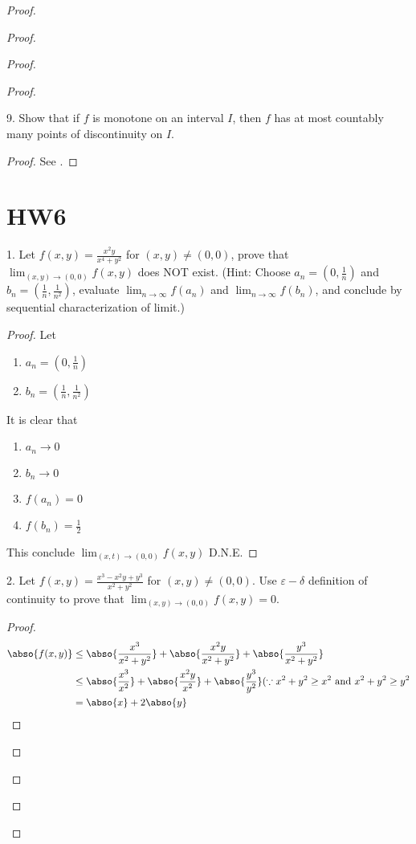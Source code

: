\documentclass{report}
\begin{document}
\begin{proof}
\begin{proof}
\begin{proof}
\begin{proof}
\begin{question}{}{}
9. Show that if \( f \) is monotone on an interval \( I \), then \( f \) has at most countably many points of discontinuity on \( I \).
\end{question}
\begin{proof}
See .
\end{proof}
\section{HW6}
\begin{question}{}{}
1. Let \( f(x, y) = \frac{x^2y}{x^4 + y^2} \) for \( (x, y) \neq (0, 0) \), prove that \( \lim_{(x, y) \to (0,0)} f(x, y) \) does NOT exist.
(Hint: Choose \( a_n = (0, \frac{1}{n}) \) and \( b_n = (\frac{1}{n}, \frac{1}{n^2}) \), evaluate \( \lim_{n \to \infty} f(a_n) \) and \( \lim_{n \to \infty} f(b_n) \), and conclude by sequential characterization of limit.)
\end{question}
\begin{proof}
Let 
\begin{enumerate}[label=(\alph*)]
  \item $a_n=(0,\frac{1}{n})$ 
  \item $b_n=(\frac{1}{n},\frac{1}{n^2})$
\end{enumerate}
It is clear that 
\begin{enumerate}[label=(\alph*)]
  \item $a_n\to 0$ 
  \item  $b_n\to 0$
  \item $f(a_n)=0$ 
  \item $f(b_n)=\frac{1}{2}$
\end{enumerate}
This conclude $\lim_{(x,t)\to (0,0)}f(x,y)$ D.N.E.
\end{proof}
\begin{question}{}{}
2. Let \( f(x, y) = \frac{x^3 - x^2y + y^3}{x^2 + y^2} \) for \( (x, y) \neq (0, 0) \). Use \( \varepsilon - \delta \) definition of continuity to prove that \( \lim_{(x, y) \to (0,0)} f(x, y) = 0 \).
\end{question}
\begin{proof}
\begin{align*}
  \abso{f(x,y)}&\leq \abso{\frac{x^3}{x^2+y^2}} +\abso{\frac{x^2y}{x^2+y^2}}+\abso{\frac{y^3}{x^2+y^2}}\\
  &\leq \abso{\frac{x^3}{x^2}}+ \abso{\frac{x^2y}{x^2}}+\abso{\frac{y^3}{y^2}}(\because x^2+y^2\geq x^2\text{ and }x^2+y^2\geq y^2\\
  &=\abso{x}+2\abso{y}
\end{align*}

\end{proof}
\end{proof}
\end{proof}
\end{proof}
\end{proof}
\end{document}
